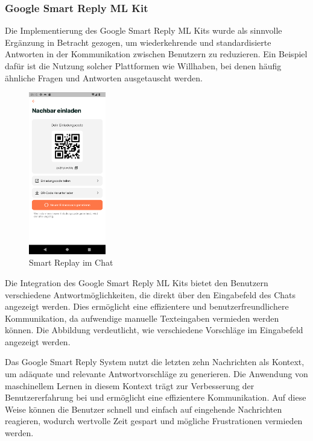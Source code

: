 \subsubsection{Google Smart Reply ML Kit}
Die Implementierung des Google Smart Reply ML Kits wurde als sinnvolle Ergänzung in Betracht gezogen, um wiederkehrende und standardisierte Antworten in der Kommunikation zwischen Benutzern zu reduzieren. Ein Beispiel dafür ist die Nutzung solcher Plattformen wie Willhaben, bei denen häufig ähnliche Fragen und Antworten ausgetauscht werden.

\begin{figure}[H]
  \centering
  \includegraphics[width=0.3\textwidth]{pics/einladecode-page.png}
  \caption{Smart Replay im Chat}
  \label{fig:einladecode}
\end{figure}

Die Integration des Google Smart Reply ML Kits bietet den Benutzern verschiedene Antwortmöglichkeiten, die direkt über den Eingabefeld des Chats angezeigt werden. Dies ermöglicht eine effizientere und benutzerfreundlichere Kommunikation, da aufwendige manuelle Texteingaben vermieden werden können. Die Abbildung verdeutlicht, wie verschiedene Vorschläge im Eingabefeld angezeigt werden.

Das Google Smart Reply System nutzt die letzten zehn Nachrichten als Kontext, um adäquate und relevante Antwortvorschläge zu generieren. Die Anwendung von maschinellem Lernen in diesem Kontext trägt zur Verbesserung der Benutzererfahrung bei und ermöglicht eine effizientere Kommunikation. Auf diese Weise können die Benutzer schnell und einfach auf eingehende Nachrichten reagieren, wodurch wertvolle Zeit gespart und mögliche Frustrationen vermieden werden.

